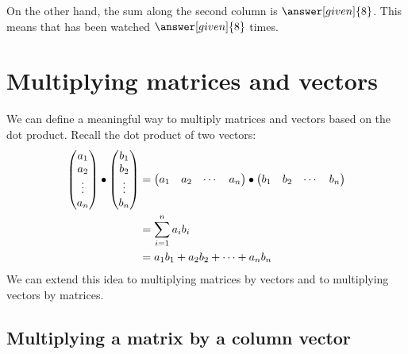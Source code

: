 \documentclass{ximera}
\begin{document}
\begin{example}
\begin{explanation}
      On the other hand, the sum along the second column is $\answer[given]{8}$. This
      means that  has been watched $\answer[given]{8}$ times.
    \end{explanation}
\end{example}





\section{Multiplying matrices and vectors}

We can define a meaningful way to multiply matrices and vectors based
on the dot product.  Recall the dot product of two vectors:
\begin{align*}
  \begin{pmatrix}
    a_1\\
    a_2\\
    \vdots\\
    a_n
  \end{pmatrix}
  \bullet
  \begin{pmatrix}
    b_1\\
    b_2\\
    \vdots\\
    b_n
  \end{pmatrix}
  &=\begin{pmatrix} a_1 & a_2 & \cdots & a_n\end{pmatrix}\bullet\begin{pmatrix} b_1 & b_2 & \cdots & b_n\end{pmatrix}\\
  &= \sum_{i=1}^n a_ib_i\\
  &= a_1b_1 + a_2b_2 +\dots+a_nb_n
\end{align*}
We can extend this idea to multiplying matrices by vectors and to
multiplying vectors by matrices.

\subsection{Multiplying a matrix by a column vector}
\end{document}
